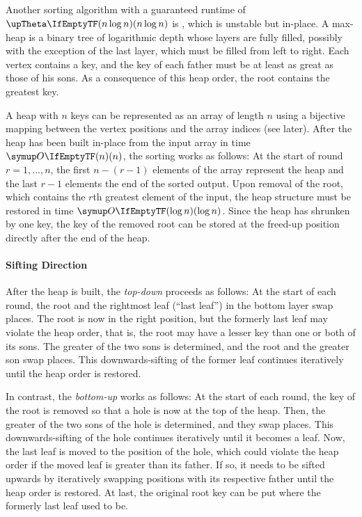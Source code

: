 \subsection{\texorpdfstring{\HS{}}{HeapSort}}
\label{subsec:tasklet:heap}

Another sorting algorithm with a guaranteed runtime of \(\bigtheta{n \log n}\) is \HS{}, which is unstable but in-place.
A max-heap is a binary tree of logarithmic depth whose layers are fully filled, possibly with the exception of the last layer, which must be filled from left to right.
Each vertex contains a key, and the key of each father must be at least as great as those of his sons.
As a consequence of this heap order, the root contains the greatest key.

A heap with \(n\) keys can be represented as an array of length \(n\) using a bijective mapping between the vertex positions and the array indices (see later).
After the heap has been built in-place from the input array in time \(\bigoh{n}\), the sorting works as follows:
At the start of round \(r = 1, \dots, n\), the first \(n - (r - 1)\) elements of the array represent the heap and the last \(r - 1\) elements the end of the sorted output.
Upon removal of the root, which contains the \(r\)th greatest element of the input, the heap structure must be restored in time \(\bigoh{\log n}\).
Since the heap has shrunken by one key, the key of the removed root can be stored at the freed-up position directly after the end of the heap.

\paragraph{Sifting Direction}
After the heap is built, the \emph{top-down} \HS{} proceeds as follows:
At the start of each round, the root and the rightmost leaf (\enquote{last leaf}) in the bottom layer swap places.
The root is now in the right position, but the formerly last leaf may violate the heap order, that is, the root may have a lesser key than one or both of its sons.
The greater of the two sons is determined, and the root and the greater son swap places.
This downwards-sifting of the former leaf continues iteratively until the heap order is restored.

In contrast, the \emph{bottom-up} \HS{} \cite{wegener1993heapsort} works as follows:
At the start of each round, the key of the root is removed so that a hole is now at the top of the heap.
Then, the greater of the two sons of the hole is determined, and they swap places.
This downwards-sifting of the hole continues iteratively until it becomes a leaf.
Now, the last leaf is moved to the position of the hole, which could violate the heap order if the moved leaf is greater than its father.
If so, it needs to be sifted upwards by iteratively swapping positions with its respective father until the heap order is restored.
At last, the original root key can be put where the formerly last leaf used to be.

